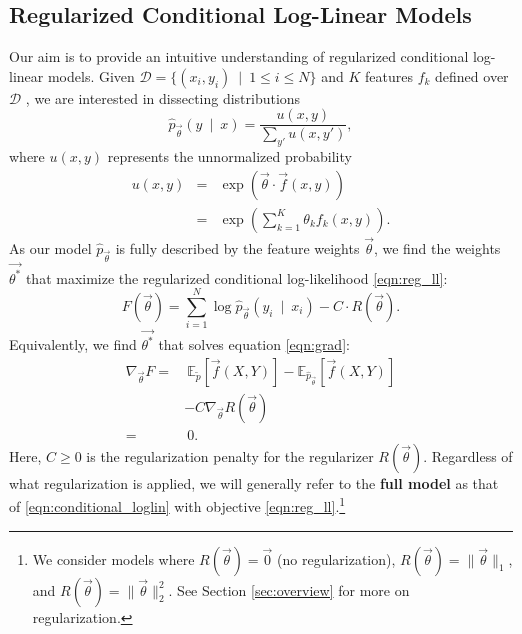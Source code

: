 \documentclass[11pt,letterpaper]{article}
\newcommand{\empirical}[0]{\ensuremath{\tilde{p}}}
\newcommand{\Data}[0]{\ensuremath{\mathcal{D}}}
\begin{document}
\subsection{Regularized Conditional Log-Linear Models} \label{sec:model} 
Our aim is to provide an intuitive understanding of regularized conditional log-linear models. Given $\Data{} = \{( x_i, y_i)\ \mid\ 1 \le i \le N\}$ and $K$ features $f_k$ defined over \Data{} , we are interested in dissecting distributions 
\begin{equation}
\hat{p}_{\vec{\theta}}\left(y\ \mid\ x\right) = \frac{u(x, y)}{\sum_{y'} u(x,y')},
\label{eqn:conditional_loglin}
\end{equation}
where $u(x,y)$ represents the unnormalized probability
\begin{eqnarray}
u(x,y) & = & \exp{\left(\vec{\theta}\cdot \vec{f}(x,y)\right)}\\
& = & \exp{\left(\sum_{k=1}^K \theta_k f_k(x,y)\right)}.
\end{eqnarray}
As our model $\hat{p}_{\vec{\theta}}$ is fully described by the feature weights $\vec{\theta}$, we find the weights $\vec{\theta^*}$ that maximize the regularized conditional log-likelihood \eqref{eqn:reg_ll}:
\begin{equation}
F\left(\vec{\theta}\right) = \sum_{i=1}^N \log{\hat{p}_{\vec{\theta}}\left(y_i\ \mid\ x_i\right)} - C \cdot R\left(\vec{\theta}\right).
\label{eqn:reg_ll}
\end{equation}
Equivalently, we find $\vec{\theta^*}$ that solves equation \eqref{eqn:grad}:
\begin{equation}
\begin{aligned}
\nabla_{\vec{\theta}} F
 = &
\ \mathbb{E}_{\empirical{}}\left[\vec{f}(X,Y)\right] 
- \mathbb{E}_{{\hat{p}_{\vec{\theta}}}}\left[\vec{f}(X,Y)\right]\\
 & - C \nabla_{\vec{\theta}}R(\vec{\theta})
\label{eqn:grad} \\
 = &\ 0.
\end{aligned}
\end{equation}
Here, $C \ge 0$ is the regularization penalty for the regularizer $R(\vec{\theta})$. Regardless of what regularization is applied, we will generally refer to the \textbf{full model} as that of \eqref{eqn:conditional_loglin} with objective \eqref{eqn:reg_ll}.\footnote{We consider models where $R(\vec{\theta}) = \vec{0}$ (no regularization), $R(\vec{\theta}) = \|\vec\theta\|_1$, and $R(\vec{\theta}) = \|\vec{\theta}\|_2^2$. See Section \ref{sec:overview} for more on regularization.}
\end{document}
